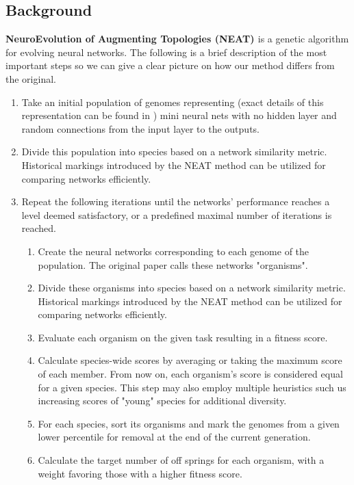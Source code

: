 \documentclass[lettersize,journal]{IEEEtran}
\begin{document}
        \subsection{Background}
        \textbf{NeuroEvolution of Augmenting Topologies (NEAT) \cite{neat}}
        is a genetic algorithm for evolving neural networks. The following is a brief description of the most important steps so we can give a clear picture on how our method differs from the original.
        \begin{enumerate}
            \item Take an initial population of genomes representing (exact details of this representation can be found in \cite{neat}) mini neural nets with no hidden layer and random connections from the input layer to the outputs.
            \item Divide this population into species based on a network similarity metric. Historical markings introduced by the NEAT method can be utilized for comparing networks efficiently.
            \item Repeat the following iterations until the networks' performance reaches a level deemed satisfactory, or a predefined maximal number of iterations is reached.
            \begin{enumerate}
                \item Create the neural networks corresponding to each genome of the population. The original paper calls these networks "organisms".
                \item Divide these organisms into species based on a network similarity metric. Historical markings introduced by the NEAT method can be utilized for comparing networks efficiently.
                \item Evaluate each organism on the given task resulting in a fitness score. 
                \item Calculate species-wide scores by averaging or taking the maximum score of each member. From now on, each organism's score is considered equal for a given species. This step may also employ multiple heuristics such us increasing scores of "young" species for additional diversity.
                \item For each species, sort its organisms and mark the genomes from a given lower percentile for removal at the end of the current generation.
                \item Calculate the target number of off springs for each organism, with a weight favoring those with a higher fitness score.

\end{enumerate}
\end{enumerate}
\end{document}
